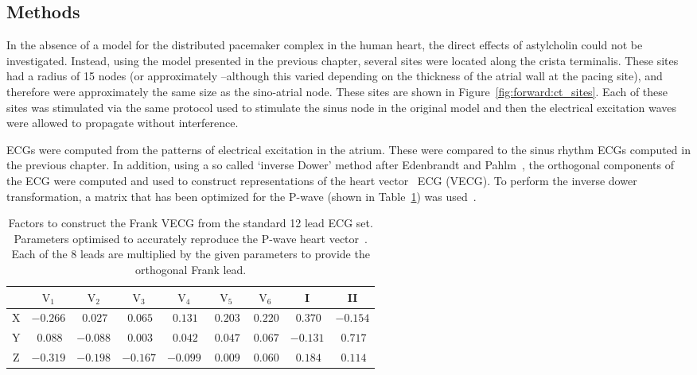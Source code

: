 \subsection{Methods}

In the absence of a model for the distributed pacemaker complex in the human
heart, the direct effects of astylcholin could not be investigated.
Instead, using the model presented in the previous chapter, several sites were
located along the crista terminalis.
These sites had a radius of 15 nodes (or approximately --although this
varied depending on the thickness of the atrial wall at the pacing site), and
therefore were approximately the same size as the sino-atrial node.
These sites are shown in Figure~\ref{fig:forward:ct_sites}.
Each of these sites was stimulated via the same protocol used to stimulate the
sinus node in the original model and then the electrical excitation waves were
allowed to propagate without interference.

ECGs were computed from the patterns of electrical excitation in the atrium.
These were compared to the sinus rhythm ECGs computed in the previous chapter.
In addition, using a so called `inverse Dower' method after Edenbrandt and
Pahlm~\cite{Edenbrandt1988}, the orthogonal components of the ECG were computed
and used to construct representations of the heart
vector~\cite{Frank1956,MacFarlane1989a} ECG (VECG).
To perform the inverse dower transformation, a matrix that has been optimized for
the P-wave (shown in Table~\ref{tbl:forward:idparams}) was
used~\cite{Guillem2007}.


\begin{table}
\caption[Inverse Dower Factors]{
\label{tbl:forward:idparams}
Factors to construct the Frank VECG from the standard 12 lead ECG set.
Parameters optimised to accurately reproduce the P-wave heart
vector~\cite{Guillem2007}.
Each of the 8 leads are multiplied by the given parameters to provide the
orthogonal Frank lead.
}
\begin{center}
\begin{tabular}{c c c c c c c c c}
\toprule
& $\text{V}_{\text{1}}$ &$\text{V}_{\text{2}}$ & $\text{V}_{\text{3}}$ &
$\text{V}_{\text{4}}$ & $\text{V}_{\text{5}}$ & $\text{V}_{\text{6}}$ & I & II \\
\midrule
X & $-0.266$ & $\:0.027$ &  $\:0.065$ & $\:0.131$ & $\:0.203$ & $\:0.220$ & $\:0.370$ & $-0.154$ \\
Y & $\:0.088$ &  $-0.088$ & $\:0.003$ & $\:0.042$ & $\:0.047$ & $\:0.067$ & $-0.131$ & $\:0.717$ \\
Z & $-0.319$ & $-0.198$ & $-0.167$ & $-0.099$ & $\:0.009$ & $\:0.060$ & $\:0.184$ & $\:0.114$ \\
\bottomrule
\end{tabular}
\end{center}
\end{table}

